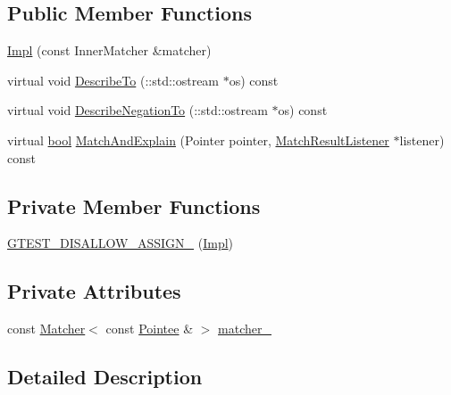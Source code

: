 \subsection*{Public Member Functions}
\begin{DoxyCompactItemize}
\item 
\hyperlink{classtesting_1_1internal_1_1PointeeMatcher_1_1Impl_a2f85fb0fee21f4f821562539d79526f7}{Impl} (const Inner\+Matcher \&matcher)
\item 
virtual void \hyperlink{classtesting_1_1internal_1_1PointeeMatcher_1_1Impl_af56f2efe315e8f4b2c1824de54755f20}{Describe\+To} (\+::std\+::ostream $\ast$os) const
\item 
virtual void \hyperlink{classtesting_1_1internal_1_1PointeeMatcher_1_1Impl_af37adcdf3e5218ca9e1954515bc135c8}{Describe\+Negation\+To} (\+::std\+::ostream $\ast$os) const
\item 
virtual \hyperlink{classbool}{bool} \hyperlink{classtesting_1_1internal_1_1PointeeMatcher_1_1Impl_a2aeaf0b7284fb2c7a7745746ec6ce63b}{Match\+And\+Explain} (Pointer pointer, \hyperlink{classtesting_1_1MatchResultListener}{Match\+Result\+Listener} $\ast$listener) const
\end{DoxyCompactItemize}
\subsection*{Private Member Functions}
\begin{DoxyCompactItemize}
\item 
\hyperlink{classtesting_1_1internal_1_1PointeeMatcher_1_1Impl_a5f3c5482155707dc44eee5e4eb7d5081}{G\+T\+E\+S\+T\+\_\+\+D\+I\+S\+A\+L\+L\+O\+W\+\_\+\+A\+S\+S\+I\+G\+N\+\_\+} (\hyperlink{classtesting_1_1internal_1_1PointeeMatcher_1_1Impl}{Impl})
\end{DoxyCompactItemize}
\subsection*{Private Attributes}
\begin{DoxyCompactItemize}
\item 
const \hyperlink{classtesting_1_1Matcher}{Matcher}$<$ const \hyperlink{classtesting_1_1internal_1_1PointeeMatcher_1_1Impl_af28def7caaa864201e03f6fcd54a841b}{Pointee} \& $>$ \hyperlink{classtesting_1_1internal_1_1PointeeMatcher_1_1Impl_a8b6095eca981f76156d7e301cef455a0}{matcher\+\_\+}
\end{DoxyCompactItemize}


\subsection{Detailed Description}
